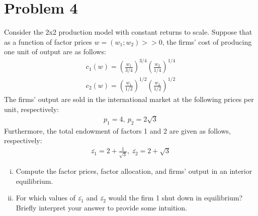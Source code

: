 \documentclass[a4paper]{article}
\begin{document}
\section*{Problem 4}
Consider the 2x2 production model with constant returns to scale. Suppose that as a
function of factor prices $w = (w_1; w_2) >> 0$, the firms' cost of producing one unit of output
are as follows:
\begin{align*}
c_1(w) = \left(\frac{w_1}{3/4}\right)^{3/4}\left(\frac{w_2}{1/4}\right)^{1/4}\\
c_2(w) = \left(\frac{w_1}{1/2}\right)^{1/2}\left(\frac{w_2}{1/2}\right)^{1/2}
\end{align*}
The firms' output are sold in the international market at the following prices per unit,
respectively:
\begin{align*}
p_1 = 4,\  p_2 = 2\sqrt{3}
\end{align*}
Furthermore, the total endowment of factors 1 and 2 are given as follows, respectively:
\begin{align*}
\bar{z_1} = 2 + \frac{1}{\sqrt{3}},\ \bar{z_2} = 2 + \sqrt{3}
\end{align*}
\begin{enumerate}[(i)]
	\item Compute the factor prices, factor allocation, and firms' output in an interior equilibrium.
	\item For which values of $\bar{z_1}$ and $\bar{z_2}$ would the firm 1 shut down in equilibrium? Briefly interpret
	your answer to provide some intuition.
\end{enumerate}
\end{document}
